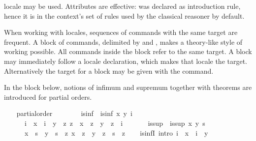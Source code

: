 \begin{isabellebody}
\begin{isamarkuptext}
  locale may be used.  Attributes are effective:  was
  declared as introduction rule, hence it is in the context's set of
  rules used by the classical reasoner by default.%
\end{isamarkuptext}%
\isamarkuptrue%
%
\begin{isamarkuptext}%
When working with locales, sequences of commands with the same
  target are frequent.  A block of commands, delimited by
   and , makes a theory-like style
  of working possible.  All commands inside the block refer to the
  same target.  A block may immediately follow a locale
  declaration, which makes that locale the target.  Alternatively the
  target for a block may be given with the 
  command.

  In the block below, notions of infimum and supremum together with
  theorems are introduced for partial orders.%
\end{isamarkuptext}%
\isamarkuptrue%
\ \ \isamarkupfalse%
\ partial{\isacharunderscore}order\ \isanewline
\isanewline
\ \ \isamarkupfalse%
\isanewline
\ \ \ \ is{\isacharunderscore}inf\ \ {\isachardoublequoteopen}is{\isacharunderscore}inf\ x\ y\ i\ {\isacharequal}\isanewline
\ \ \ \ \ \ {\isacharparenleft}i\ {\isasymsqsubseteq}\ x\ {\isasymand}\ i\ {\isasymsqsubseteq}\ y\ {\isasymand}\ {\isacharparenleft}{\isasymforall}z{\isachardot}\ z\ {\isasymsqsubseteq}\ x\ {\isasymand}\ z\ {\isasymsqsubseteq}\ y\ {\isasymlongrightarrow}\ z\ {\isasymsqsubseteq}\ i{\isacharparenright}{\isacharparenright}{\isachardoublequoteclose}\isanewline
\isanewline
\ \ \isamarkupfalse%
\isanewline
\ \ \ \ is{\isacharunderscore}sup\ \ {\isachardoublequoteopen}is{\isacharunderscore}sup\ x\ y\ s\ {\isacharequal}\isanewline
\ \ \ \ \ \ {\isacharparenleft}x\ {\isasymsqsubseteq}\ s\ {\isasymand}\ y\ {\isasymsqsubseteq}\ s\ {\isasymand}\ {\isacharparenleft}{\isasymforall}z{\isachardot}\ x\ {\isasymsqsubseteq}\ z\ {\isasymand}\ y\ {\isasymsqsubseteq}\ z\ {\isasymlongrightarrow}\ s\ {\isasymsqsubseteq}\ z{\isacharparenright}{\isacharparenright}{\isachardoublequoteclose}\isanewline
%
\isadeliminvisible
\isanewline
\ \ %
\endisadeliminvisible
%
\isataginvisible
{}\isamarkupfalse%
\ is{\isacharunderscore}infI\ {\isacharbrackleft}intro{\isacharquery}{\isacharbrackright}{\isacharcolon}\ {\isachardoublequoteopen}i\ {\isasymsqsubseteq}\ x\ {\isasymLongrightarrow}\ i\ {\isasymsqsubseteq}\ y\ {\isasymLongrightarrow}\isanewline

\end{isabellebody}
